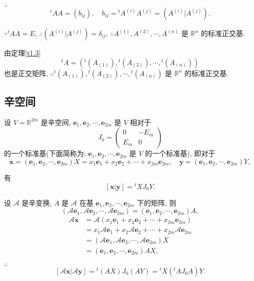 \documentclass[color=black,device=normal,lang=cn,mode=geye]{elegantnote}
\begin{document}
$\therefore$
\[{}^tAA=(b_{ij}),\quad b_{ij}={}^tA^{(i)}A^{(j)}=(A^{(i)}|A^{(j)}).\]

$\because{}^tAA=E$, $\therefore(A^{(i)}|A^{(j)})=\delta_{ij}$, $\therefore A^{(1)},A^{(2)},\cdots,A^{(n)}$ 是 $\mathbb{R}^n$ 的标准正交基.

由定理\ref{t1.3}
\[{}^tA=({}^t(A_{(1)}),{}^t(A_{(2)}),\cdots,{}^t(A_{(n)}))\]
也是正交矩阵, $\therefore{}^t(A_{(1)}),{}^t(A_{(2)}),\cdots,{}^t(A_{(n)})$ 是 $\mathbb{R}^n$ 的标准正交基.
\subsection{辛空间}
设 $V=\mathbb{R}^{2m}$ 是辛空间, $\boldsymbol{e}_1,\boldsymbol{e}_2,\cdots,\boldsymbol{e}_{2m}$ 是 $V$ 相对于
\[J_0=\begin{pmatrix}
    0 & -E_m \\
    E_m & 0
\end{pmatrix}\]
的一个标准基(下面简称为: $\boldsymbol{e}_1,\boldsymbol{e}_2,\cdots,\boldsymbol{e}_{2m}$ 是 $V$ 的一个标准基), 即对于
\[\boldsymbol{x}=(\boldsymbol{e}_1,\boldsymbol{e}_2,\cdots,\boldsymbol{e}_{2m})X=x_1\boldsymbol{e}_1+x_2\boldsymbol{e}_2+\cdots+x_{2m}\boldsymbol{e}_{2m},\quad\boldsymbol{y}=(\boldsymbol{e}_1,\boldsymbol{e}_2,\cdots,\boldsymbol{e}_{2m})Y,\]

有
\[[\boldsymbol{x}|\boldsymbol{y}]={}^tXJ_0Y.\]

设 $\mathcal{A}$ 是辛变换, $A$ 是 $\mathcal{A}$ 在基 $\boldsymbol{e}_1,\boldsymbol{e}_2,\cdots,\boldsymbol{e}_{2m}$ 下的矩阵, 则
\[(\mathcal{A}\boldsymbol{e}_1,\mathcal{A}\boldsymbol{e}_2,\cdots,\mathcal{A}\boldsymbol{e}_{2m})=(\boldsymbol{e}_1,\boldsymbol{e}_2,\cdots,\boldsymbol{e}_{2m})A,\]
\begin{align*}
    \mathcal{A}\boldsymbol{x} & =\mathcal{A}(x_1\boldsymbol{e}_1+x_2\boldsymbol{e}_2+\cdots+x_{2m}\boldsymbol{e}_{2m}) \\
    & =x_1\mathcal{A}\boldsymbol{e}_1+x_2\mathcal{A}\boldsymbol{e}_2+\cdots+x_{2m}\mathcal{A}\boldsymbol{e}_{2m} \\
    & =(\mathcal{A}\boldsymbol{e}_1,\mathcal{A}\boldsymbol{e}_2,\cdots,\mathcal{A}\boldsymbol{e}_{2m})X \\
    & =(\boldsymbol{e}_1,\boldsymbol{e}_2,\cdots,\boldsymbol{e}_{2m})AX,
\end{align*}

$\therefore$
\[[\mathcal{A}\boldsymbol{x}|\mathcal{A}\boldsymbol{y}]={}^t(AX)J_0(AY)={}^tX({}^tAJ_0A)Y.\]
\end{document}
